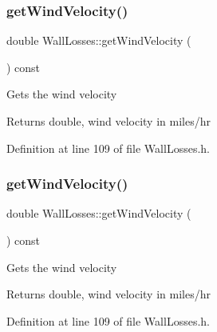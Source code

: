 \mbox{\label{class_wall_losses_ae68657cacdfbaf8cdc48324dd580cf3b}} 
\subsubsection{\texorpdfstring{get\+Wind\+Velocity()}{getWindVelocity()}\hspace{0.1cm}{\footnotesize\ttfamily [2/3]}}
{\footnotesize\ttfamily double Wall\+Losses\+::get\+Wind\+Velocity (\begin{DoxyParamCaption}{ }\end{DoxyParamCaption}) const\hspace{0.3cm}{\ttfamily [inline]}}

Gets the wind velocity \begin{DoxyReturn}{Returns}
double, wind velocity in miles/hr 
\end{DoxyReturn}


Definition at line 109 of file Wall\+Losses.\+h.

\mbox{\label{class_wall_losses_ae68657cacdfbaf8cdc48324dd580cf3b}} 
\subsubsection{\texorpdfstring{get\+Wind\+Velocity()}{getWindVelocity()}\hspace{0.1cm}{\footnotesize\ttfamily [3/3]}}
{\footnotesize\ttfamily double Wall\+Losses\+::get\+Wind\+Velocity (\begin{DoxyParamCaption}{ }\end{DoxyParamCaption}) const\hspace{0.3cm}{\ttfamily [inline]}}

Gets the wind velocity \begin{DoxyReturn}{Returns}
double, wind velocity in miles/hr 
\end{DoxyReturn}


Definition at line 109 of file Wall\+Losses.\+h.

\mbox{\label{class_wall_losses_a08a8f4c9add0ce78733be4558cc8410b}} 
